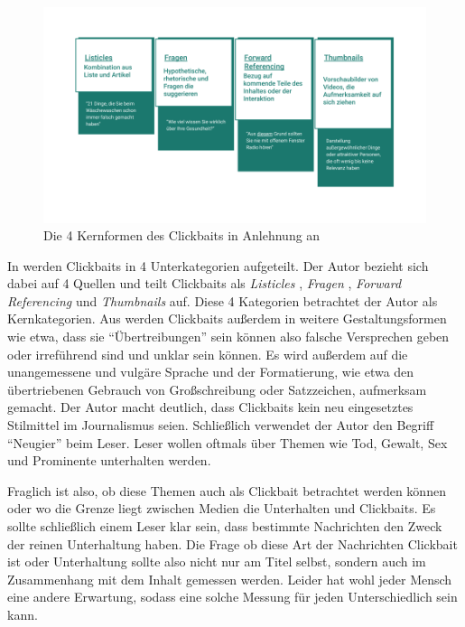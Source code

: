 \begin{figure}[H]
    \centering
    \includegraphics[width=15cm]{kapitel4/clickbaits.png}
    \caption[Die Kernformen des Clickbaits]{Die 4 Kernformen des Clickbaits in Anlehnung an \cite*[71]{Hrsg2020}}
    \label{TSNE}
\end{figure}

In \cite*[70-71]{Hrsg2020} werden Clickbaits in 4 Unterkategorien aufgeteilt. Der Autor bezieht sich dabei auf 4 Quellen und teilt Clickbaits als \textit{Listicles} \cite*{Vijgen2014}, \textit{Fragen} \cite*{Lai2014}, \textit{Forward Referencing} \cite*{Blom2015} und \textit{Thumbnails} \cite*{Zannettou2018} auf. Diese 4 Kategorien betrachtet der Autor als Kernkategorien. Aus \cite*[71]{Hrsg2020} werden Clickbaits außerdem in weitere Gestaltungsformen wie etwa, dass sie \enquote{Übertreibungen} sein können also falsche Versprechen geben oder irreführend sind und unklar sein können. Es wird außerdem auf die unangemessene und vulgäre Sprache und der Formatierung, wie etwa den übertriebenen Gebrauch von Großschreibung oder Satzzeichen, aufmerksam gemacht. Der Autor \cite*[75-76]{Hrsg2020} macht deutlich, dass Clickbaits kein neu eingesetztes Stilmittel im Journalismus seien. Schließlich verwendet der Autor den Begriff \enquote{Neugier} beim Leser. Leser wollen oftmals über Themen wie Tod, Gewalt, Sex und Prominente \cite*{Tenenboim2015} unterhalten werden. 

Fraglich ist also, ob diese Themen auch als Clickbait betrachtet werden können oder wo die Grenze liegt zwischen Medien die Unterhalten und Clickbaits. Es sollte schließlich einem Leser klar sein, dass bestimmte Nachrichten den Zweck der reinen Unterhaltung haben. Die Frage ob diese Art der Nachrichten Clickbait ist oder Unterhaltung sollte also nicht nur am Titel selbst, sondern auch im Zusammenhang mit dem Inhalt gemessen werden. Leider hat wohl jeder Mensch eine andere Erwartung, sodass eine solche Messung für jeden Unterschiedlich sein kann. 




